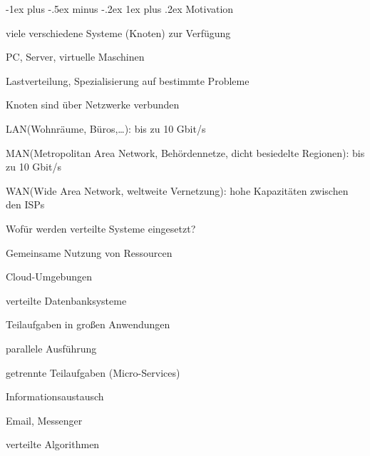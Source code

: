 \documentclass[10pt]{article}
\makeatletter
\renewcommand{\subsubsection}{\@startsection{subsubsection}{3}{0mm}%
                                {-1ex plus -.5ex minus -.2ex}%
                                {1ex plus .2ex}%
                                {\normalfont\small\bfseries}}
\makeatother
\begin{document}
\begin{itemize*}
\subsubsection{Motivation}
\begin{itemize*}
  \item viele verschiedene Systeme (Knoten) zur Verfügung
  \begin{itemize*}
    \item PC, Server, virtuelle Maschinen
    \item Lastverteilung, Spezialisierung auf bestimmte Probleme
  \end{itemize*}
  \item Knoten sind über Netzwerke verbunden
  \begin{itemize*}
    \item LAN(Wohnräume, Büros,…): bis zu 10 Gbit/s
    \item MAN(Metropolitan Area Network, Behördennetze, dicht besiedelte Regionen): bis zu 10 Gbit/s
    \item WAN(Wide Area Network, weltweite Vernetzung): hohe Kapazitäten zwischen den ISPs
  \end{itemize*}
\end{itemize*}
Wofür werden verteilte Systeme eingesetzt? 
\begin{itemize*}
  \item Gemeinsame Nutzung von Ressourcen
  \begin{itemize*}
    \item Cloud-Umgebungen
    \item verteilte Datenbanksysteme
    
  \end{itemize*}
  \item Teilaufgaben in großen Anwendungen
  \begin{itemize*}
    \item parallele Ausführung
    \item getrennte Teilaufgaben (Micro-Services)
    
  \end{itemize*}
  \item Informationsaustausch
  \begin{itemize*}
    \item Email, Messenger
    \item verteilte Algorithmen
  \end{itemize*}
\end{itemize*}

\end{itemize*}
\end{document}
